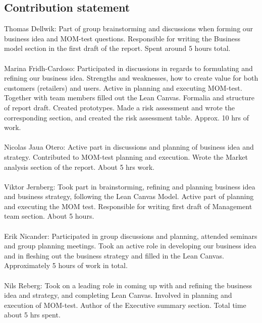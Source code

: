 \documentclass[titlepage]{article}
\begin{document}
\subsection{Contribution statement}
Thomas Dellwik: Part of group brainstorming and discussions when forming our business idea and MOM-test questions. Responsible for writing the Business model section in the first draft of the report. Spent around 5 hours total. \\
\\
Marina Fridh-Cardoso: Participated in discussions in regards to formulating and refining our business idea. Strengths and weaknesses, how to create value for both customers (retailers) and users. Active in planning and executing MOM-test. Together with team members filled out the Lean Canvas. Formalia and structure of report draft. Created prototypes. Made a risk assessment and wrote the corresponding section, and created the risk assessment table. Approx. 10 hrs of work. \\
\\
Nicolas Jaua Otero: Active part in discussions and planning of business idea and strategy. Contributed to MOM-test planning and execution. Wrote the Market analysis section of the report. About 5 hrs work.\\
\\
Viktor Jernberg: Took part in brainstorming, refining and planning business idea and business strategy, following the Lean Canvas Model. Active part of planning and executing the MOM test. Responsible for writing first draft of Management team section. About 5 hours.\\
\\
Erik Nicander: Participated in group discussions and planning, attended seminars and group planning meetings. Took an active role in developing our business idea and in fleshing out the business strategy and filled in the Lean Canvas. Approximately 5 hours of work in total.\\
\\
Nils Reberg: Took on a leading role in coming up with and refining the business idea and strategy, and completing Lean Canvas.  Involved in planning and execution of MOM-test. Author of the Executive summary section. Total time about 5 hrs spent.\\



\end{document}

